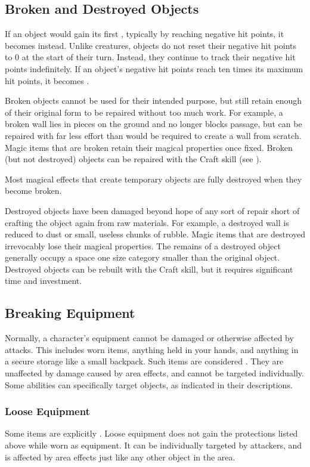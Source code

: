   \subsection{Broken and Destroyed Objects}\label{Broken and Destroyed Objects}
    If an object would gain its first , typically by reaching negative hit points, it becomes  instead.
    Unlike creatures, objects do not reset their negative hit points to 0 at the start of their turn.
    Instead, they continue to track their negative hit points indefinitely.
    If an object's negative hit points reach ten times its maximum hit points, it becomes .

    Broken objects cannot be used for their intended purpose, but still retain enough of their original form to be repaired without too much work.
    For example, a broken wall lies in pieces on the ground and no longer blocks passage, but can be repaired with far less effort than would be required to create a wall from scratch.
    Magic items that are broken retain their magical properties once fixed.
    Broken (but not destroyed) objects can be repaired with the Craft skill (see ).

    Most magical effects that create temporary objects are fully destroyed when they become broken.

    Destroyed objects have been damaged beyond hope of any sort of repair short of crafting the object again from raw materials.
    For example, a destroyed wall is reduced to dust or small, useless chunks of rubble.
    Magic items that are destroyed irrevocably lose their magical properties.
    The remains of a destroyed object generally occupy a space one size category smaller than the original object.
    Destroyed objects can be rebuilt with the Craft skill, but it requires significant time and investment.

  \subsection{Breaking Equipment}\label{Breaking Equipment}
    Normally, a character's equipment cannot be damaged or otherwise affected by attacks.
    This includes worn items, anything held in your hands, and anything in a secure storage like a small backpack.
    Such items are considered .
    They are unaffected by damage caused by area effects, and cannot be targeted individually.
    Some abilities can specifically target  objects, as indicated in their descriptions.

    \subsubsection{Loose Equipment}\label{Loose Equipment}
      Some items are explicitly .
      Loose equipment does not gain the protections listed above while worn as equipment.
      It can be individually targeted by attackers, and is affected by area effects just like any other object in the area.
